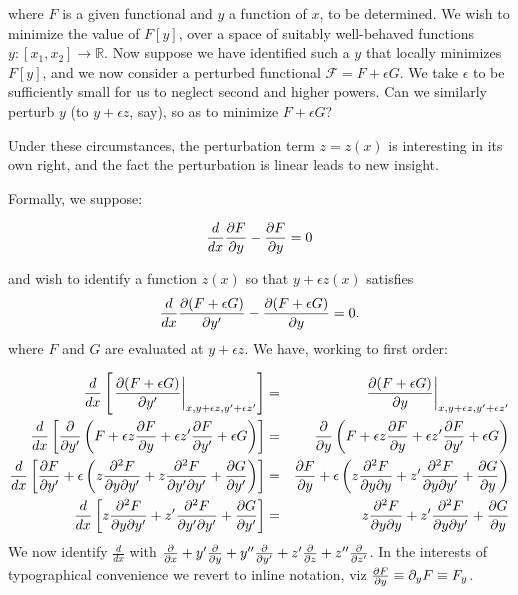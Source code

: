 \documentclass[pdflatex,sn-mathphys-num]{sn-jnl}%
\theoremstyle{thmstyleone}%
\theoremstyle{thmstyletwo}%
\theoremstyle{thmstylethree}%
\begin{document}
\noindent where $F$ is a given functional and $y$ a function of $x$,
to be determined.  We wish to minimize the value of $F[y]$, over a
space of suitably well-behaved functions
$y\colon\left[x_1,x_2\right]\longrightarrow\mathbb{R}$.  Now suppose
we have identified such a $y$ that locally minimizes $F[y]$, and we
now consider a perturbed functional $\mathcal{F}=F+\epsilon G$.  We
take $\epsilon$ to be sufficiently small for us to neglect second and
higher powers.  Can we similarly perturb $y$ (to $y+\epsilon z$, say),
so as to minimize $F+\epsilon G$?

Under these circumstances, the perturbation term $z=z(x)$ is
interesting in its own right, and the fact the perturbation is linear
leads to new insight.

Formally, we suppose:

\begin{equation}
  \frac{d}{dx}\frac{\partial{F}}{\partial{y}}-\frac{\partial{F}}{\partial{y}} = 0 
\end{equation}

and wish to identify a function $z(x)$ so that $y+\epsilon z(x)$
satisfies
\begin{equation}
  \frac{d}{dx}\frac{\partial{(F+\epsilon G)}}{\partial{y'}}-\frac{\partial{(F+\epsilon G)}}{\partial{y}} = 0.
\end{equation}
%
where $F$ and $G$ are evaluated at $y+\epsilon z$.  We have, working
to first order:

\begin{eqnarray}
\frac{d}{dx}\left[\left.\frac{\partial{(F+\epsilon G)}}{\partial{y'}}\right|_{x,y+\epsilon z,y'+\epsilon z'}\right]
&=& \left.\frac{\partial{(F+\epsilon G)}}{\partial{y}}\right|_{x,y+\epsilon z,y'+\epsilon z'}\nonumber\\
\frac{d}{dx}\left[\frac{\partial{}}{\partial{y'}}\left(F + \epsilon z\frac{\partial{F}}{\partial{y}} + \epsilon z'\frac{\partial{F}}{\partial{y'}}+\epsilon G\right)\right]
&=& \frac{\partial{}}{\partial{y}}\left(F + \epsilon z\frac{\partial{F}}{\partial{y}} + \epsilon z'\frac{\partial{F}}{\partial{y'}}+\epsilon G\right)\nonumber\\
\frac{d}{dx}\left[\frac{\partial{F}}{\partial{y'}} + \epsilon\left(z\frac{\partial^2{F}}{\partial{y}\partial{y'}} + z\frac{\partial^2{F}}{\partial{y'}\partial{y'}} + \frac{\partial{G}}{\partial{y'}}\right)\right]
&=& \frac{\partial{F}}{\partial{y}} + \epsilon\left(z\frac{\partial^2{F}}{\partial{y}\partial{y}} + z'\frac{\partial^2{F}}{\partial{y}\partial{y'}} + \frac{\partial{G}}{\partial{y}}\right)\nonumber\\
\frac{d}{dx}\left[z\frac{\partial^2{F}}{\partial{y}\partial{y'}} + z'\frac{\partial^2{F}}{\partial{y'}\partial{y'}} + \frac{\partial{G}}{\partial{y'}}\right]
&=& z\frac{\partial^2{F}}{\partial{y}\partial{y}} + z'\frac{\partial^2{F}}{\partial{y}\partial{y'}} + \frac{\partial{G}}{\partial{y}}
\end{eqnarray}
%
We now identify $\frac{d}{dx}$ with $\frac{\partial{}}{\partial{x}} + y'\frac{\partial{}}{\partial{y}} +
y''\frac{\partial{}}{\partial{y'}} + z'\frac{\partial{}}{\partial{z}} + z''\frac{\partial{}}{\partial{z'}}$.  In the interests of
typographical convenience we revert to inline notation, viz
$\frac{\partial{F}}{\partial{y}}\equiv\partial_yF\equiv F_y$.
\end{document}
